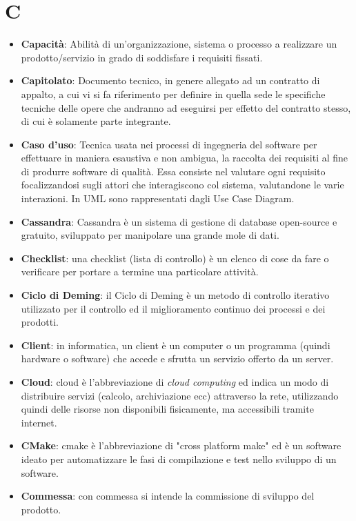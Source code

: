 \documentclass[a4paper, oneside, openany, dvipsnames, table]{article}
\begin{document}
\section{C}
\begin{itemize} 
\item \textbf{Capacità}: Abilità di un'organizzazione, sistema o processo a realizzare un prodotto/servizio in grado di soddisfare i requisiti fissati.
\item \textbf{Capitolato}: Documento tecnico, in genere allegato ad un contratto di appalto, a cui vi si fa riferimento per definire in quella sede le specifiche tecniche delle opere che andranno ad eseguirsi per effetto del contratto stesso, di cui è solamente parte integrante.
\item \textbf{Caso d'uso}: Tecnica usata nei processi di ingegneria del software per effettuare in maniera esaustiva
e non ambigua, la raccolta dei requisiti al fine di produrre software di qualità. Essa consiste nel valutare ogni requisito focalizzandosi sugli attori che interagiscono col sistema,
valutandone le varie interazioni. In UML sono rappresentati dagli Use Case Diagram.
\item \textbf{Cassandra}: Cassandra è un sistema di gestione di database  open-source e gratuito, sviluppato per manipolare una grande mole di dati.
\item \textbf{Checklist}: una checklist  (lista di controllo) è un elenco di cose da fare o verificare per portare a termine una particolare attività.
\item \textbf{Ciclo di Deming}: il Ciclo di Deming è un metodo di controllo iterativo utilizzato per il controllo ed il miglioramento continuo dei processi e dei prodotti.
\item \textbf{Client}: in informatica, un client è un computer o un programma (quindi hardware o software) che accede e sfrutta un servizio offerto da un server.
\item \textbf{Cloud}: cloud è l'abbreviazione di \textit{cloud computing} ed indica un modo di distribuire servizi (calcolo, archiviazione ecc) attraverso la rete, utilizzando quindi delle risorse non disponibili fisicamente, ma accessibili tramite internet.
\item \textbf{CMake}: cmake è l'abbreviazione di "cross platform make" ed è un software ideato per automatizzare le fasi di compilazione e test nello sviluppo di un software.
\item \textbf{Commessa}: con commessa si intende la commissione di sviluppo del prodotto.

\end{itemize}
\end{document}

